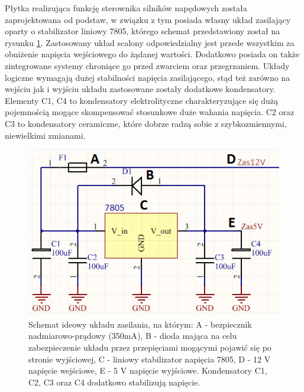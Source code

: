 Płytka realizująca funkcję sterownika silników napędowych została zaprojektowana od podstaw, w związku z tym posiada własny układ zasilający oparty o stabilizator liniowy 7805, którego schemat przedstawiony został na rysunku \ref{zas_at}. Zastosowany układ scalony odpowiedzialny jest przede wszystkim za obniżenie napięcia wejściowego do żądanej wartości. Dodatkowo posiada on także zintegrowane systemy chroniące go przed zwarciem oraz przegrzaniem. Układy logiczne wymagają dużej stabilności napięcia zasilającego, stąd też zarówno na wejściu jak i wyjściu układu zastosowane zostały dodatkowe kondensatory. Elementy C1, C4 to kondensatory elektrolityczne charakteryzujące się dużą pojemnością mogące skompensować stosunkowe duże wahania napięcia. C2 oraz C3 to kondensatory ceramiczne, które dobrze radzą sobie z szybkozmiennymi, niewielkimi zmianami.

  \begin{figure}[H]
    \begin{center}
      \includegraphics[scale=0.8]{imgs/zasilanie_atmeg.png}
 	\caption[Zasilanie sterownika silników.]{\small{Schemat ideowy układu zasilania, na którym: A - bezpiecznik nadmiarowo-prądowy (350mA), B - dioda mająca na celu zabezpieczenie układu przez przepięciami mogącymi pojawić się po stronie wyjściowej, C - liniowy stabilizator napięcia 7805, D - 12 V napięcie wejściowe, E - 5 V napięcie wyjściowe. Kondensatory C1, C2, C3 oraz C4 dodatkowo stabilizują napięcie.}}
	\label{zas_at}
    \end{center}
  \end{figure}  
  
